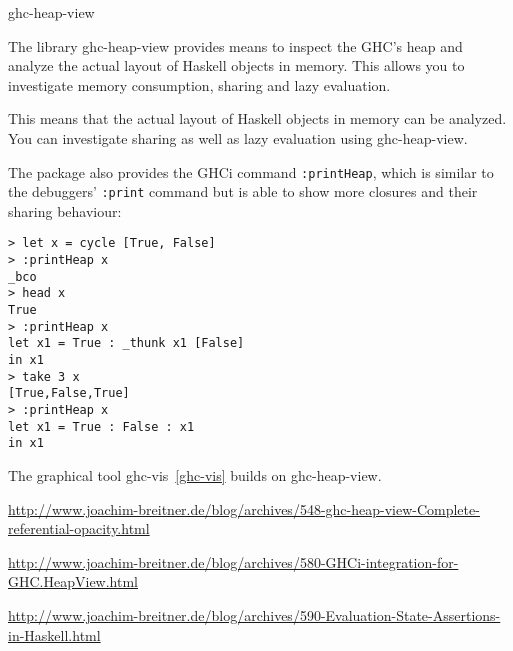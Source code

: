 \documentclass[DIV16,twocolumn,10pt]{scrreprt}
\begin{document}
\begin{hcarentry}{ghc-heap-view}
\makeheader

The library ghc-heap-view provides means to inspect the GHC's heap and analyze the actual layout of Haskell objects in memory. This allows you to investigate memory consumption, sharing and lazy evaluation.

This means that the actual layout of Haskell objects in memory can be analyzed.
You can investigate sharing as well as lazy evaluation using ghc-heap-view.

The package also provides the GHCi command \texttt{:printHeap}, which is similar to the debuggers' \texttt{:print} command but is able to show more closures and their sharing behaviour:

\begin{verbatim}
> let x = cycle [True, False]
> :printHeap x
_bco
> head x
True
> :printHeap x
let x1 = True : _thunk x1 [False]
in x1
> take 3 x
[True,False,True]
> :printHeap x
let x1 = True : False : x1
in x1
\end{verbatim}

The graphical tool ghc-vis~\cref{ghc-vis} builds on ghc-heap-view.

\FurtherReading
  \begin{compactitem}
    \item \url{http://www.joachim-breitner.de/blog/archives/548-ghc-heap-view-Complete-referential-opacity.html}
    \item \url{http://www.joachim-breitner.de/blog/archives/580-GHCi-integration-for-GHC.HeapView.html}
    \item \url{http://www.joachim-breitner.de/blog/archives/590-Evaluation-State-Assertions-in-Haskell.html}
  \end{compactitem}
\end{hcarentry}
\end{document}
